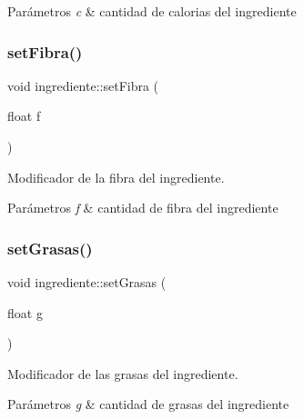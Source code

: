 \begin{DoxyParams}{Parámetros}
{\em c} & cantidad de calorias del ingrediente \\
\hline
\end{DoxyParams}
\mbox{\label{classingrediente_a13928358db435d4a42b348f6ea1ee548}} 
\subsubsection{\texorpdfstring{set\+Fibra()}{setFibra()}}
{\footnotesize\ttfamily void ingrediente\+::set\+Fibra (\begin{DoxyParamCaption}\item[{float}]{f }\end{DoxyParamCaption})}



Modificador de la fibra del ingrediente. 


\begin{DoxyParams}{Parámetros}
{\em f} & cantidad de fibra del ingrediente \\
\hline
\end{DoxyParams}
\mbox{\label{classingrediente_a5b20e7a788dcdb5685c66c7362d65533}} 
\subsubsection{\texorpdfstring{set\+Grasas()}{setGrasas()}}
{\footnotesize\ttfamily void ingrediente\+::set\+Grasas (\begin{DoxyParamCaption}\item[{float}]{g }\end{DoxyParamCaption})}



Modificador de las grasas del ingrediente. 


\begin{DoxyParams}{Parámetros}
{\em g} & cantidad de grasas del ingrediente \\
\hline
\end{DoxyParams}
\mbox{\label{classingrediente_ab678b69e2374ae25439162e4288d1e8a}} 
